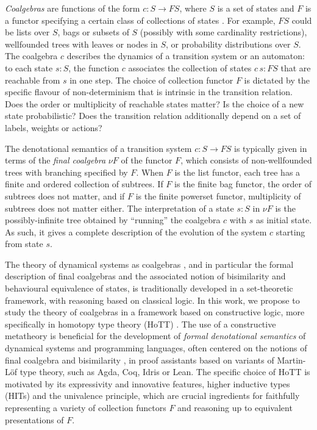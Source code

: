 \documentclass[runningheads]{llncs}
\begin{document}
\emph{Coalgebras} are functions of the form $c : S \to F S$, where $S$ is a set of states and $F$ is a functor specifying a certain class of collections of states \cite{Rutten2000,Jacobs2016}. For example, $F S$ could be lists over $S$, bags or subsets of $S$ (possibly with some cardinality restrictions), wellfounded trees with leaves or nodes in $S$, or probability distributions over $S$. The coalgebra $c$ describes the dynamics of a transition system or an automaton: to each state $s : S$, the function $c$ associates the collection of states $c \,s : F S$ that are reachable from $s$ in one step. The choice of collection functor $F$ is dictated by the specific flavour of non-determinism that is intrinsic in the transition relation. Does the order or multiplicity of reachable states matter? Is the choice of a new state probabilistic? Does the transition relation additionally depend on a set of labels, weights or actions?

The denotational semantics of a transition system $c : S \to F S$ is typically given in terms of the \emph{final coalgebra} $\nu F$ of the functor $F$, which  consists of non-wellfounded trees with branching specified by $F$. When $F$ is the list functor, each tree has a finite and ordered collection of subtrees. If $F$ is the finite bag functor, the order of subtrees does not matter, and if $F$ is the finite powerset functor, multiplicity of subtrees does not matter either. %
The interpretation of a state $s : S$ in $\nu F$ is the possibly-infinite tree obtained by ``running'' the coalgebra $c$ with $s$ as initial state. As such, it gives a complete description of the evolution of the system $c$ starting from state $s$.

The theory of dynamical systems as coalgebras \cite{Rutten2000,Jacobs2016}, and in particular the formal description of final coalgebras \cite{Barr1993,Adamek1995,Worrell2005} and the associated notion of bisimilarity and behavioural equivalence of states, is traditionally developed in a set-theoretic framework, with reasoning based on classical logic. In this work, we propose to study the theory of coalgebras in a framework based on constructive logic, more specifically in homotopy type theory (HoTT) \cite{HoTTBook}. The use of a constructive metatheory is beneficial for the development of \emph{formal denotational semantics} of dynamical systems and programming languages, often centered on the notions of final coalgebra and bisimilarity \cite{Turi1997}, in proof assistants based on variants of Martin-L{\"o}f type theory, such as Agda, Coq, Idris or Lean. The specific choice of HoTT is motivated by its expressivity and innovative features, higher inductive types (HITs) and the univalence principle, which are crucial ingredients for faithfully representing a variety of collection functors $F$ and reasoning up to equivalent presentations of $F$. 
\end{document}
